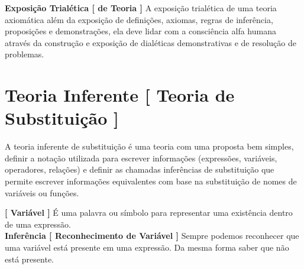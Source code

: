 \documentclass[10pt,a4paper]{report}
\begin{document}
\hspace{\baselineskip}

\textbf{Exposição Trialética [ de Teoria ]} A exposição trialética de uma teoria axiomática além da exposição de definições, axiomas, regras de inferência, proposições e demonstrações, ela deve lidar com a consciência alfa humana através da construção e exposição de dialéticas demonstrativas e de resolução de problemas.


\section{Teoria Inferente [ Teoria de Substituição ]}

\hspace{\baselineskip}

A teoria inferente de substituição é uma teoria com uma proposta bem simples, definir a notação utilizada para escrever informações (expressões, variáveis, operadores, relações) e definir as chamadas inferências de substituição que permite escrever informações equivalentes com base na substituição de nomes de variáveis ou funções.

\hspace{\baselineskip}

\textbf{[ Variável ]} É uma palavra ou símbolo para representar uma existência dentro de uma expressão.\\

\textbf{Inferência [ Reconhecimento de Variável ]} Sempre podemos reconhecer que uma variável está presente em uma expressão. Da mesma forma saber que não está presente.
\end{document}
